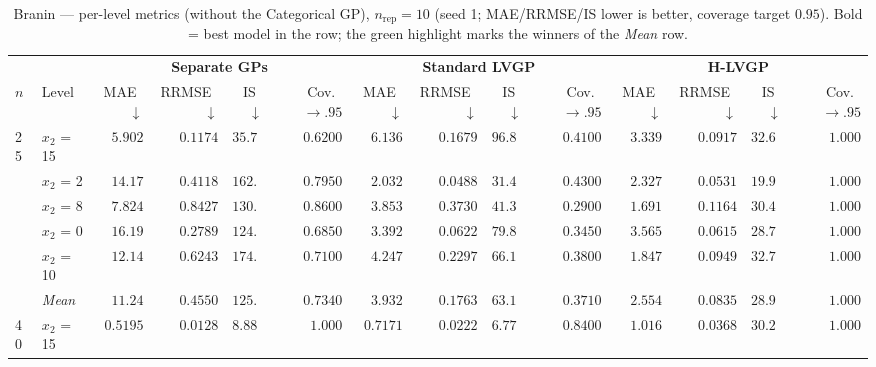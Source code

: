 \begin{table}[htbp]
\centering
\scriptsize
\setlength{\tabcolsep}{2.5pt}
\setlength{\fboxsep}{1pt}
\caption{Branin --- per-level metrics (without the Categorical GP), $n_{\mathrm{rep}}=10$ (seed 1; MAE/RRMSE/IS lower is better, coverage target $0.95$). Bold = best model in the row; the green highlight marks the winners of the \emph{Mean} row.}
\label{tab:branin_hetero_nrep10_nocat}
\begin{tabular}{llrrrrrrrrrrrr}
\toprule
 & & \multicolumn{4}{c}{\textbf{Separate GPs}} & \multicolumn{4}{c}{\textbf{Standard LVGP}} & \multicolumn{4}{c}{\textbf{H-LVGP}} \\
\cmidrule(lr){3-6} \cmidrule(lr){7-10} \cmidrule(lr){11-14}
$n$ & Level & MAE~$\downarrow$ & RRMSE~$\downarrow$ & IS~$\downarrow$ & Cov.~$\to.95$ & MAE~$\downarrow$ & RRMSE~$\downarrow$ & IS~$\downarrow$ & Cov.~$\to.95$ & MAE~$\downarrow$ & RRMSE~$\downarrow$ & IS~$\downarrow$ & Cov.~$\to.95$ \\
\midrule
\multirow{6}{*}{25} & $x_2$ = 15 & $5.902$ & $0.1174$ & $35.77$ & $0.6200$ & $6.136$ & $0.1679$ & $96.80$ & $0.4100$ & {\boldmath$3.339$} & {\boldmath$0.0917$} & {\boldmath$32.68$} & {\boldmath$1.000$} \\
 & $x_2$ = 2 & $14.17$ & $0.4118$ & $162.3$ & $0.7950$ & {\boldmath$2.032$} & {\boldmath$0.0488$} & $31.46$ & $0.4300$ & $2.327$ & $0.0531$ & {\boldmath$19.96$} & {\boldmath$1.000$} \\
 & $x_2$ = 8 & $7.824$ & $0.8427$ & $130.3$ & $0.8600$ & $3.853$ & $0.3730$ & $41.36$ & $0.2900$ & {\boldmath$1.691$} & {\boldmath$0.1164$} & {\boldmath$30.41$} & {\boldmath$1.000$} \\
 & $x_2$ = 0 & $16.19$ & $0.2789$ & $124.3$ & $0.6850$ & {\boldmath$3.392$} & $0.0622$ & $79.81$ & $0.3450$ & $3.565$ & {\boldmath$0.0615$} & {\boldmath$28.74$} & {\boldmath$1.000$} \\
 & $x_2$ = 10 & $12.14$ & $0.6243$ & $174.6$ & $0.7100$ & $4.247$ & $0.2297$ & $66.10$ & $0.3800$ & {\boldmath$1.847$} & {\boldmath$0.0949$} & {\boldmath$32.76$} & {\boldmath$1.000$} \\
 & \textit{Mean} & $11.24$ & $0.4550$ & $125.4$ & $0.7340$ & $3.932$ & $0.1763$ & $63.11$ & $0.3710$ & \colorbox{green!20}{\boldmath$2.554$} & \colorbox{green!20}{\boldmath$0.0835$} & \colorbox{green!20}{\boldmath$28.91$} & \colorbox{green!20}{\boldmath$1.000$} \\
\midrule
\multirow{6}{*}{40} & $x_2$ = 15 & {\boldmath$0.5195$} & {\boldmath$0.0128$} & $8.882$ & {\boldmath$1.000$} & $0.7171$ & $0.0222$ & {\boldmath$6.774$} & $0.8400$ & $1.016$ & $0.0368$ & $30.29$ & $1.000$ \\

\end{tabular}
\end{table}
